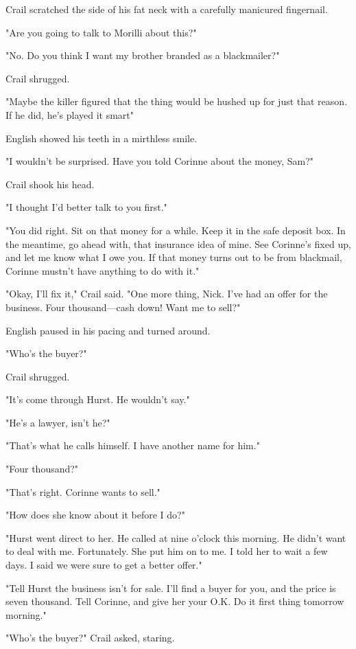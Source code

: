 \documentclass{novel}
\begin{document}
Crail scratched the side of his fat neck with a carefully manicured fingernail.

"Are you going to talk to Morilli about this?"

"No. Do you think I want my brother branded as a blackmailer?"

Crail shrugged.

"Maybe the killer figured that the thing would be hushed up for just that reason. If he did, he's played it smart"

English showed his teeth in a mirthless smile.

"I wouldn't be surprised. Have you told Corinne about the money, Sam?"

Crail shook his head.

"I thought I'd better talk to you first."

"You did right. Sit on that money for a while. Keep it in the safe deposit box. In the meantime, go ahead with, that insurance idea of mine. See Corinne's fixed up, and let me know what I owe you. If that money turns out to be from blackmail, Corinne mustn't have anything to do with it."

"Okay, I'll fix it," Crail said. "One more thing, Nick. I've had an offer for the business. Four thousand—cash down! Want me to sell?"

English paused in his pacing and turned around.

"Who's the buyer?"

Crail shrugged.

"It's come through Hurst. He wouldn't say."

"He's a lawyer, isn't he?"

"That's what he calls himself. I have another name for him."

"Four thousand?"

"That's right. Corinne wants to sell."

"How does she know about it before I do?"

"Hurst went direct to her. He called at nine o'clock this morning. He didn't want to deal with me. Fortunately. She put him on to me. I told her to wait a few days. I said we were sure to get a better offer."

"Tell Hurst the business isn't for sale. I'll find a buyer for you, and the price is seven thousand. Tell Corinne, and give her your O.K. Do it first thing tomorrow morning."

"Who's the buyer?" Crail asked, staring.
\end{document}

